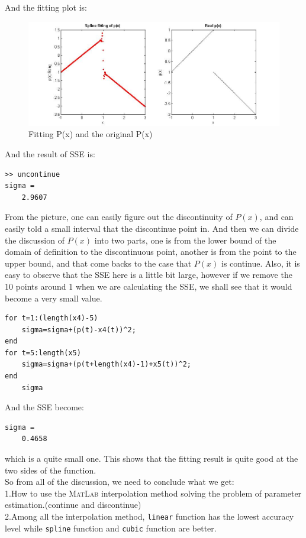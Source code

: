 \documentclass[a4paper]{article}
\begin{document}
And the fitting plot is:
\begin{figure}[!htb]
\centering
\includegraphics[width=16.6cm]{discontinue.jpg}
\caption{Fitting P(x) and the original P(x)}
\label{dis1_1}
\end{figure}
And the result of SSE is:
\begin{verbatim}
>> uncontinue
sigma =
    2.9607
\end{verbatim}
From the picture, one can easily figure out the discontinuity of $P(x)$, and can easily told a small interval that the discontinue point in. And then we can divide the discussion of $P(x)$ into two parts, one is from the lower bound of the domain of definition to the discontinuous point, another is from the point to the upper bound, and that come backs to the case that $P(x)$ is continue. Also, it is easy to observe that the SSE here is a little bit large, however if we remove the 10 points around 1 when we are calculating the SSE, we shall see that it would become a very small value.\\
\begin{verbatim}
for t=1:(length(x4)-5)
    sigma=sigma+(p(t)-x4(t))^2;
end
for t=5:length(x5)
    sigma=sigma+(p(t+length(x4)-1)+x5(t))^2;
end
    sigma
\end{verbatim}
And the SSE become:
\begin{verbatim}
sigma =
    0.4658
\end{verbatim}
which is a quite small one. This shows that the fitting result is quite good at the two sides of the function.\\
So from all of the discussion, we need to conclude what we get:\\
1.How to use the \textsc{MatLab} interpolation method solving the problem of parameter estimation.(continue and discontinue)\\
2.Among all the interpolation method, \verb$linear$ function has the lowest accuracy level while \verb$spline$ function and \verb$cubic$ function are better.\\
\end{document}
